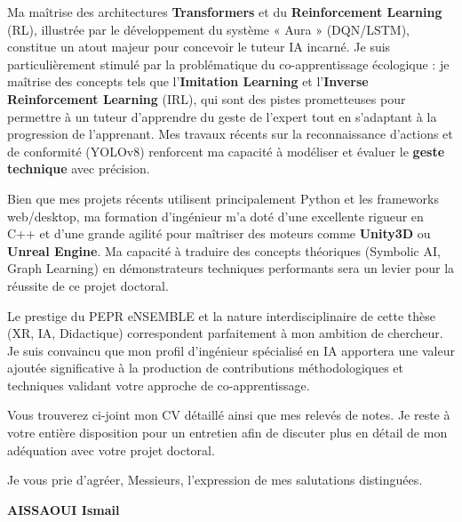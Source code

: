 \documentclass[a4paper,11pt]{article}
\begin{document}
Ma maîtrise des architectures \textbf{Transformers} et du \textbf{Reinforcement Learning} (RL), illustrée par le développement du système « Aura » (DQN/LSTM), constitue un atout majeur pour concevoir le tuteur IA incarné. Je suis particulièrement stimulé par la problématique du co-apprentissage écologique : je maîtrise des concepts tels que l'\textbf{Imitation Learning} et l'\textbf{Inverse Reinforcement Learning} (IRL), qui sont des pistes prometteuses pour permettre à un tuteur d'apprendre du geste de l'expert tout en s'adaptant à la progression de l'apprenant. Mes travaux récents sur la reconnaissance d'actions et de conformité (YOLOv8) renforcent ma capacité à modéliser et évaluer le \textbf{geste technique} avec précision.

Bien que mes projets récents utilisent principalement Python et les frameworks web/desktop, ma formation d'ingénieur m'a doté d'une excellente rigueur en C++ et d'une grande agilité pour maîtriser des moteurs comme \textbf{Unity3D} ou \textbf{Unreal Engine}. Ma capacité à traduire des concepts théoriques (Symbolic AI, Graph Learning) en démonstrateurs techniques performants sera un levier pour la réussite de ce projet doctoral.

Le prestige du PEPR eNSEMBLE et la nature interdisciplinaire de cette thèse (XR, IA, Didactique) correspondent parfaitement à mon ambition de chercheur. Je suis convaincu que mon profil d'ingénieur spécialisé en IA apportera une valeur ajoutée significative à la production de contributions méthodologiques et techniques validant votre approche de co-apprentissage.

Vous trouverez ci-joint mon CV détaillé ainsi que mes relevés de notes. Je reste à votre entière disposition pour un entretien afin de discuter plus en détail de mon adéquation avec votre projet doctoral.

Je vous prie d'agréer, Messieurs, l'expression de mes salutations distinguées.

\vspace{0.4cm}

\begin{flushleft}
    \textbf{AISSAOUI Ismail}
\end{flushleft}
\end{document}
